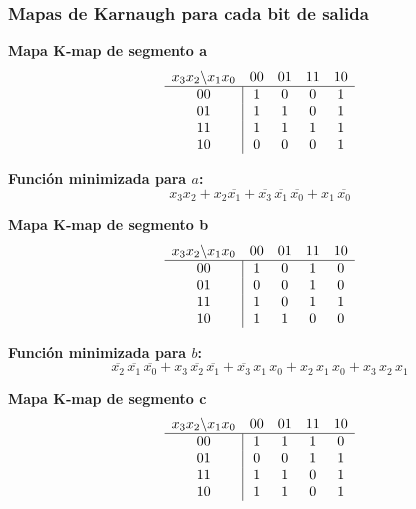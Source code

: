 \documentclass[12pt]{article}
\begin{document}
\subsubsection{Mapas de Karnaugh para cada bit de salida}

\bigskip

\noindent
\textbf{Mapa K‐map de segmento \textsf{a}}  
\[
\begin{array}{c|cccc}
\multicolumn{1}{c}{x_3x_2 \backslash x_1x_0} & 00 & 01 & 11 & 10 \\
\hline
00 & 1 & 0 & 0 & 1 \\
01 & 1 & 1 & 0 & 1 \\
11 & 1 & 1 & 1 & 1 \\
10 & 0 & 0 & 0 & 1 \\
\end{array}
\]
\vspace{1em}

\noindent
\textbf{Función minimizada para \(a\):}
\[
x_3x_2 + x_2\overline{x_1} + \overline{x_3}\,\overline{x_1}\,\overline{x_0} + x_1\,\overline{x_0}
\]

\noindent
\textbf{Mapa K‐map de segmento \textsf{b}}  
\[
\begin{array}{c|cccc}
\multicolumn{1}{c}{x_3x_2 \backslash x_1x_0} & 00 & 01 & 11 & 10 \\
\hline
00 & 1 & 0 & 1 & 0 \\
01 & 0 & 0 & 1 & 0 \\
11 & 1 & 0 & 1 & 1 \\
10 & 1 & 1 & 0 & 0 \\
\end{array}
\]
\vspace{1em}

\noindent
\textbf{Función minimizada para \(b\):}
\[
\overline{x_2}\,\overline{x_1}\,\overline{x_0} + x_3\,\overline{x_2}\,\overline{x_1} + \overline{x_3}\,x_1\,x_0 + x_2\,x_1\,x_0 + x_3\,x_2\,x_1
\]

\noindent
\textbf{Mapa K‐map de segmento \textsf{c}}  
\[
\begin{array}{c|cccc}
\multicolumn{1}{c}{x_3x_2 \backslash x_1x_0} & 00 & 01 & 11 & 10 \\
\hline
00 & 1 & 1 & 1 & 0 \\
01 & 0 & 0 & 1 & 1 \\
11 & 1 & 1 & 0 & 1 \\
10 & 1 & 1 & 0 & 1 \\
\end{array}
\]
\vspace{1em}
\end{document}
